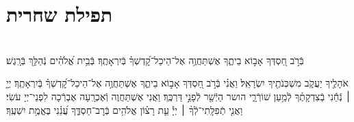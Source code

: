 \documentclass[twoside, openany, parskip=half, 11pt]{book}
\begin{document}

\setcounter{page}{1}

\vspace*{\fill}

\thispagestyle{empty}
\begin{Large}
\begin{center}
\end{center}
\end{Large}


\vspace*{\fill}


\centerlast

\chapter[תפילת שחרית]{ תפילת שחרית }

\renewcommand{\thefootnote}{\roman{footnote}} %
\setlength{\parskip}{0.75em}

\\
בְּֿרֹ֣ב חַ֭סְדְּךָ אָב֣וֹא בֵיתֶ֑ךָ אֶשְׁתַּחֲוֶ֥ה אֶל־הֵיכַל־קׇ֝דְשְׁךָ֗ בְּֿיִרְאָתֶֽךָ׃
%
בְּֿבֵ֥ית אֱ֝לֹהִ֗ים נְֿהַלֵּ֥ךְ בְּֿרָֽגֶשׁ׃


אֹהָלֶ֖יךָ יַעֲקֹ֑ב מִשְׁכְּנֹתֶ֖יךָ יִשְׂרָאֵֽל׃
וַאֲנִ֗י בְּֿרֹ֣ב חַ֭סְדְּךָ אָב֣וֹא בֵיתֶ֑ךָ אֶשְׁתַּחֲוֶ֥ה אֶל־הֵיכַל־קׇ֝דְשְׁךָ֗ בְּֿיִרְאָתֶֽךָ׃
יְיָ֤ ׀ נְֿחֵ֬נִי בְֿצִדְקָתֶ֗ךָ לְֿמַ֥עַן שׁוֹרְֿרָ֑י הושר הַיְֿשַׁ֖ר לְֿפָנַ֣י דַּרְכֶּֽךָ׃
וַאֲנִי אֶשְׁתַּחֲוֶה וְֿאֶכְרָֽעָה אֶבְרְֿכָה לִפְנֵי־יְיָ עֹשִׂי׃
וַאֲנִ֤י
%
תְֿפִלָּֽתִי־לְֿךָ֨ ׀ יְיָ֡ עֵ֤ת רָצ֗וֹן אֱלֹהִ֥ים בְּֿרׇב־חַסְדֶּ֑ךָ עֲ֝נֵ֗נִי בֶּאֱמֶ֥ת יִשְׁעֶֽךָ׃
\end{document}
